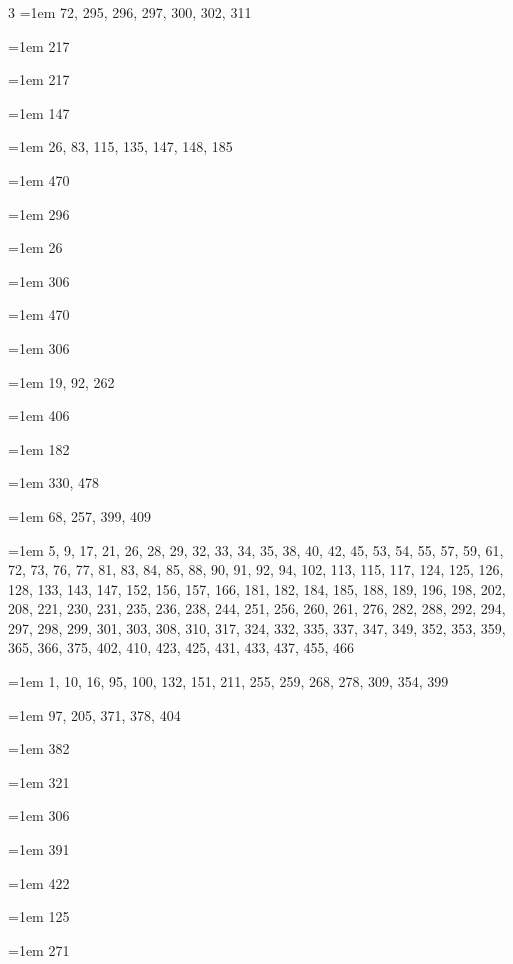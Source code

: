 \begin{multicols}{3}
\hangindent=1em  72, 295, 296, 297, 300, 302, 311\par
\hangindent=1em  217\par
\hangindent=1em  217\par
\hangindent=1em  147\par
\hangindent=1em  26, 83, 115, 135, 147, 148, 185\par
\hangindent=1em  470\par
\hangindent=1em  296\par
\hangindent=1em  26\par
\hangindent=1em  306\par
\hangindent=1em  470\par
\hangindent=1em  306\par
\hangindent=1em  19, 92, 262\par
\hangindent=1em  406\par
\hangindent=1em  182\par
\hangindent=1em  330, 478\par
\hangindent=1em  68, 257, 399, 409\par
\hangindent=1em  5, 9, 17, 21, 26, 28, 29, 32, 33, 34, 35, 38, 40, 42, 45, 53, 54, 55, 57, 59, 61, 72, 73, 76, 77, 81, 83, 84, 85, 88, 90, 91, 92, 94, 102, 113, 115, 117, 124, 125, 126, 128, 133, 143, 147, 152, 156, 157, 166, 181, 182, 184, 185, 188, 189, 196, 198, 202, 208, 221, 230, 231, 235, 236, 238, 244, 251, 256, 260, 261, 276, 282, 288, 292, 294, 297, 298, 299, 301, 303, 308, 310, 317, 324, 332, 335, 337, 347, 349, 352, 353, 359, 365, 366, 375, 402, 410, 423, 425, 431, 433, 437, 455, 466\par
\hangindent=1em  1, 10, 16, 95, 100, 132, 151, 211, 255, 259, 268, 278, 309, 354, 399\par
\hangindent=1em  97, 205, 371, 378, 404\par
\hangindent=1em  382\par
\hangindent=1em  321\par
\hangindent=1em  306\par
\hangindent=1em  391\par
\hangindent=1em  422\par
\hangindent=1em  125\par
\hangindent=1em  271\par

\end{multicols}
